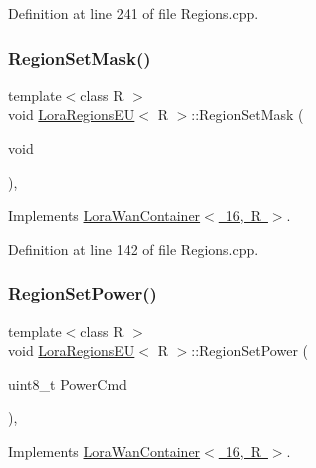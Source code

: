 Definition at line 241 of file Regions.\+cpp.

\mbox{\label{class_lora_regions_e_u_a9aef35dea0d5101768696bed87fa8380}} 
\subsubsection{\texorpdfstring{Region\+Set\+Mask()}{RegionSetMask()}}
{\footnotesize\ttfamily template$<$class R $>$ \\
void \mbox{\hyperlink{class_lora_regions_e_u}{Lora\+Regions\+EU}}$<$ R $>$\+::Region\+Set\+Mask (\begin{DoxyParamCaption}\item[{void}]{ }\end{DoxyParamCaption})\hspace{0.3cm}{\ttfamily [protected]}, {\ttfamily [virtual]}}



Implements \mbox{\hyperlink{class_lora_wan_container_a1256cfca2973d3cb9114a3f25dfa9aca}{Lora\+Wan\+Container$<$ 16, R $>$}}.



Definition at line 142 of file Regions.\+cpp.

\mbox{\label{class_lora_regions_e_u_a322d0f9d2a00243ef01fe15c017ed288}} 
\subsubsection{\texorpdfstring{Region\+Set\+Power()}{RegionSetPower()}}
{\footnotesize\ttfamily template$<$class R $>$ \\
void \mbox{\hyperlink{class_lora_regions_e_u}{Lora\+Regions\+EU}}$<$ R $>$\+::Region\+Set\+Power (\begin{DoxyParamCaption}\item[{uint8\+\_\+t}]{Power\+Cmd }\end{DoxyParamCaption})\hspace{0.3cm}{\ttfamily [protected]}, {\ttfamily [virtual]}}



Implements \mbox{\hyperlink{class_lora_wan_container_a6f489634d893e32270ded4b471f93080}{Lora\+Wan\+Container$<$ 16, R $>$}}.



